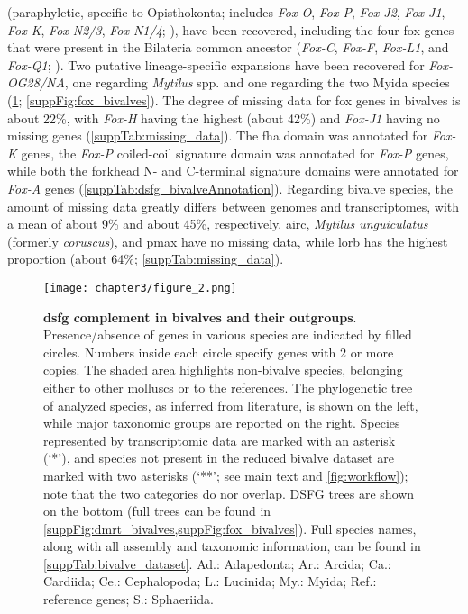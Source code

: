 (paraphyletic, specific to Opisthokonta; includes \textit{Fox-O}, \textit{Fox-P}, \textit{Fox-J2}, \textit{Fox-J1}, \textit{Fox-K}, \textit{Fox-N2/3}, \textit{Fox-N1/4}; \textbf{\cite{larroux2008genesis}}), have been recovered, including the four \gls{fox} genes that were present in the Bilateria common ancestor (\textit{Fox-C}, \textit{Fox-F}, \textit{Fox-L1}, and \textit{Fox-Q1}; \textbf{\cite{shimeld2010clustered}}). Two putative lineage-specific expansions have been recovered for \textit{Fox-OG28/NA}, one regarding \textit{Mytilus} spp. and one regarding the two Myida species (\cref{fig:DSFG_bivalveCompilation}; \cref{suppFig:fox_bivalves}). The degree of missing data for \gls{fox} genes in bivalves is about 22\%, with \textit{Fox-H} having the highest (about 42\%) and \textit{Fox-J1} having no missing genes (\cref{suppTab:missing_data}). The \gls{fha} domain was annotated for \textit{Fox-K} genes, the \textit{Fox-P} coiled-coil signature domain was annotated for \textit{Fox-P} genes, while both the forkhead N- and C-terminal signature domains were annotated for \textit{Fox-A} genes (\cref{suppTab:dsfg_bivalveAnnotation}).
Regarding bivalve species, the amount of missing data greatly differs between genomes and transcriptomes, with a mean of about 9\% and about 45\%, respectively. \gls{airc}, \textit{Mytilus unguiculatus} (formerly \textit{coruscus}), and \gls{pmax} have no missing data, while \gls{lorb} has the highest proportion (about 64\%; \cref{suppTab:missing_data}).


\begin{figure}
	\centering
	\texttt{[image: chapter3/figure\_2.png]}
	
	\caption[\textbf{\gls{dsfg} complement in bivalves and their outgroups}]
	{
		\textbf{\gls{dsfg} complement in bivalves and their outgroups}. Presence/absence of genes in various species are indicated by filled circles. Numbers inside each circle specify genes with 2 or more copies. The shaded area highlights non-bivalve species, belonging either to other molluscs or to the references. The phylogenetic tree of analyzed species, as inferred from literature, is shown on the left, while major taxonomic groups are reported on the right. Species represented by transcriptomic data are marked with an asterisk (‘*’), and species not present in the reduced bivalve dataset are marked with two asterisks (‘**’; see main text and \cref{fig:workflow}); note that the two categories do nor overlap. DSFG trees are shown on the bottom (full trees can be found in \cref{suppFig:dmrt_bivalves,suppFig:fox_bivalves}). Full species names, along with all assembly and taxonomic information, can be found in \cref{suppTab:bivalve_dataset}.  Ad.: Adapedonta; Ar.: Arcida; Ca.: Cardiida; Ce.: Cephalopoda; L.: Lucinida; My.: Myida; Ref.: reference genes; S.: Sphaeriida.
	}
	\label{fig:DSFG_bivalveCompilation}
\end{figure}

